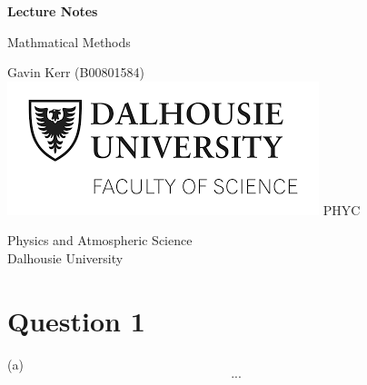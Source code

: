 \documentclass[12pt, a4paper]{article}
\begin{document}
\begin{titlepage}
   \begin{center}
       \vspace*{0.5cm}

       \LARGE{\textbf{Lecture Notes}}

       \vspace{1cm}
        \Large{Mathmatical Methods}
            
       \vspace{1cm}
		\small{Gavin Kerr (B00801584)} \\
		\vfill
		\includegraphics[scale=0.65]{dal_logo2.png}
       \vfill
           \large{PHYC }
            
       \vspace{0.8cm}
     
            
       Physics and Atmospheric Science\\
       Dalhousie University\\
            
   \end{center}
\end{titlepage}




\section*{Question 1}
(a)
\begin{align*}
...
\end{align*}
\end{document}
